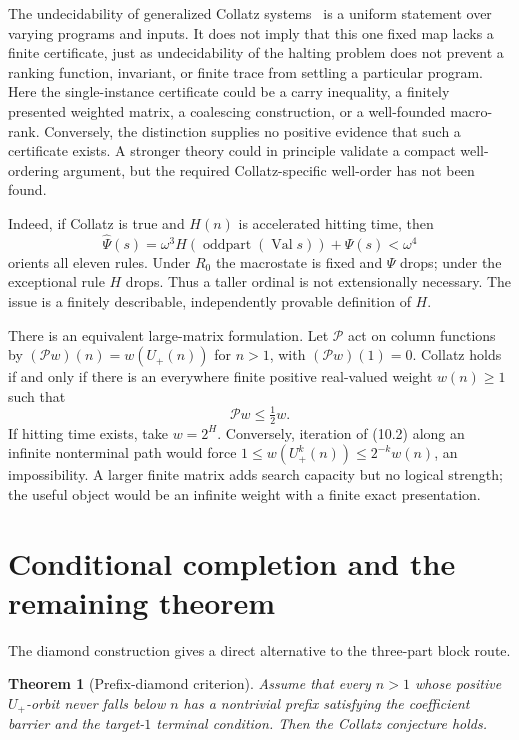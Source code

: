 \documentclass[11pt,reqno]{amsart}
\newtheorem{theorem}{Theorem}[section]
\theoremstyle{remark}
\newcommand{\Up}{U_{+}}
\begin{document}
The undecidability of generalized Collatz systems~\cite{KurtzSimon} is a
uniform statement over varying programs and inputs.  It does not imply that
this one fixed map lacks a finite certificate, just as undecidability of the
halting problem does not prevent a ranking function, invariant, or finite
trace from settling a particular program.  Here the single-instance
certificate could be a carry inequality, a finitely presented weighted
matrix, a coalescing construction, or a well-founded macro-rank.  Conversely,
the distinction supplies no positive evidence that such a certificate exists.
A stronger theory could in principle validate a compact well-ordering
argument, but the required Collatz-specific well-order has not been found.

Indeed, if Collatz is true and $H(n)$ is accelerated hitting time, then
\[
 \widehat\Psi(s)=\omega^3H(\operatorname{oddpart}(\operatorname{Val}s))
                  +\Psi(s)<\omega^4                 \tag{10.1}
\]
orients all eleven rules.  Under $R_0$ the macrostate is fixed and $\Psi$
drops; under the exceptional rule $H$ drops.  Thus a taller ordinal is not
extensionally necessary.  The issue is a finitely describable, independently
provable definition of $H$.

There is an equivalent large-matrix formulation.  Let $\mathcal P$ act on
column functions by $(\mathcal Pw)(n)=w(\Up(n))$ for $n>1$, with
$(\mathcal Pw)(1)=0$.  Collatz holds if and only if there is an everywhere
finite positive real-valued weight $w(n)\ge1$ such that
\[
 \mathcal Pw\le\tfrac12w.                            \tag{10.2}
\]
If hitting time exists, take $w=2^H$.  Conversely, iteration of (10.2) along
an infinite nonterminal path would force $1\le w(\Up^k(n))\le2^{-k}w(n)$,
an impossibility.  A larger finite matrix adds search capacity but no logical
strength; the useful object would be an infinite weight with a finite exact
presentation.

\section{Conditional completion and the remaining theorem}

The diamond construction gives a direct alternative to the three-part block
route.

\begin{theorem}[Prefix-diamond criterion]\label{thm:prefixcriterion}
Assume that every $n>1$ whose positive $\Up$-orbit never falls below $n$
has a nontrivial prefix satisfying the coefficient barrier and the target-$1$
terminal condition.  Then the Collatz conjecture holds.
\end{theorem}
\end{document}
